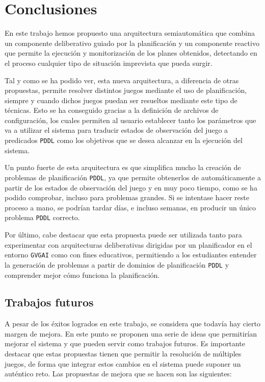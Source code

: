 
\chapter{Conclusiones}

En este trabajo hemos propuesto una arquitectura semiautomática que combina un componente
deliberativo guiado por la planificación y un componente reactivo que permite la ejecución y
monitorización de los planes obtenidos, detectando en el proceso cualquier tipo de situación
imprevista que pueda surgir.

Tal y como se ha podido ver, esta nueva arquitectura, a diferencia de otras propuestas,
permite resolver distintos juegos mediante el uso de planificación, siempre y cuando dichos juegos
puedan ser resueltos mediante este tipo de técnicas. Esto se ha conseguido gracias a la definición
de archivos de configuración, los cuales permiten al usuario establecer tanto los parámetros que va
a utilizar el sistema para traducir estados de observación del juego a predicados \texttt{PDDL}
como los objetivos que se desea alcanzar en la ejecución del sistema.

Un punto fuerte de esta arquitectura es que simplifica mucho la creación de problemas
de planificación \texttt{PDDL}, ya que permite obtenerlos de automáticamente a partir
de los estados de observación del juego y en muy poco tiempo, como se ha podido comprobar, incluso
para problemas grandes. Si se intentase hacer reste proceso a mano, se podrían tardar días, e incluso semanas,
en producir un único problema \texttt{PDDL} correcto.

Por último, cabe destacar que esta propuesta puede ser utilizada tanto para experimentar
con arquitecturas deliberativas dirigidas por un planificador en el entorno \texttt{GVGAI}
como con fines educativos, permitiendo a los estudiantes entender la generación de problemas
a partir de dominios de planificación \texttt{PDDL} y comprender mejor cómo funciona la
planificación.

\section{Trabajos futuros}

A pesar de los éxitos logrados en este trabajo, se considera que todavía hay cierto margen
de mejora. En este punto se proponen una serie de ideas que permitirían mejorar el sistema y
que pueden servir como trabajos futuros. Es importante destacar que estas propuestas tienen
que permitir la resolución de múltiples juegos, de forma que integrar estos cambios en el
sistema puede suponer un auténtico reto. Las propuestas de mejora que se hacen son las siguientes:

